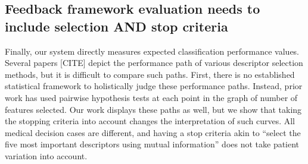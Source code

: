 \subsection{Feedback framework evaluation needs to include selection AND stop criteria}
Finally, our system directly measures expected classification performance values. Several papers [CITE] depict the performance path of various descriptor selection methods, but it is difficult to compare such paths. First, there is no established statistical framework to holistically judge these performance paths. Instead, prior work has used pairwise hypothesis tests at each point in the graph of number of features selected. Our work displays these paths as well, but we show that taking the stopping criteria into account changes the interpretation of such curves. All medical decision cases are different, and having a stop criteria akin to ``select the five most important descriptors using mutual information'' does not take patient variation into account. 


 
 



 
